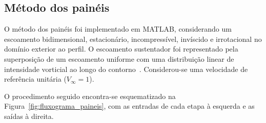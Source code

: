 \subsection*{Método dos painéis}

O método dos painéis foi implementado em MATLAB,
considerando um escoamento bidimensional, estacionário,
incompressível, invíscido e irrotacional no domínio
exterior ao perfil. O escoamento sustentador foi
representado pela superposição de um escoamento uniforme
com uma distribuição linear de intensidade vorticial
ao longo do contorno~\cite{katz}. Considerou-se uma velocidade de
referência unitária ($V_\infty=1$).

O procedimento seguido encontra-se esquematizado na
Figura~\ref{fig:fluxograma_paineis}, com as entradas de cada etapa à esquerda
e as saídas à direita.

